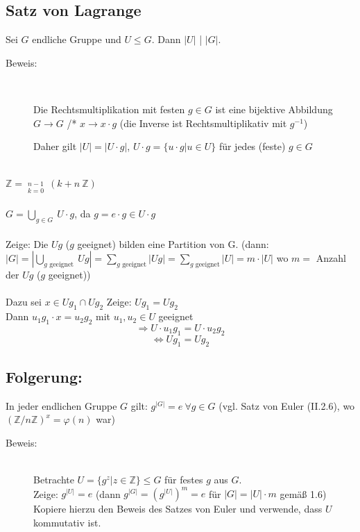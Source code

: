 \subsection{Satz von Lagrange}
Sei $G$ endliche Gruppe und $U \leq G$. Dann $|U|$ \Large{|} \normalsize{$|G|$}.
\begin{description}
	\item[Beweis:] \quad\\
	\item[] Die Rechtsmultiplikation mit festen $g \in G$ ist eine bijektive Abbildung $G \rightarrow G$ /* $x \rightarrow x 
		\cdot g$ (die Inverse ist Rechtsmultiplikativ mit $g^{-1}$)
	\item[] Daher gilt $|U| = |U \cdot g|$, $U \cdot g = \{u \cdot g|u \in U\}$ für jedes (feste) $g \in G$
\end{description}
\quad\\
$\mathbb{Z} = \mathop{\dot{\bigcup}}\limits^{n-1}_{k = 0} \ (k+n \ \mathbb{Z})$\\
\quad\\
$G = \mathop{\bigcup}\limits_{g \in G} \ U \cdot g$,  da $g = e \cdot g \in U \cdot g$\\
\quad\\
Zeige: Die $Ug$ ($g$ geeignet) bilden eine Partition von G. (dann:\\
 $|G| = | \mathop{\bigcup}\limits_{g \textrm{ geeignet}} \ Ug| = \sum\limits_{g\textrm{ geeignet}}|Ug| = \sum\limits_{g\textrm{ geeignet}} |U| = m \cdot |U|$ wo $m =$ Anzahl der $Ug$ ($g$ geeignet))\\
\quad\\
Dazu sei $x \in Ug_{1} \cap Ug_{2}$ Zeige: $Ug_{1} = Ug_{2}$\\
Dann $u_{1}g_{1} \cdot x = u_{2}g_{2}$ mit $u_{1}, u_{2} \in U$ geeignet
\begin{equation*}
	\Rightarrow U \cdot u_{1}g_{1} = U \cdot u_{2}g_{2}
\end{equation*}
\begin{equation*}
	\Leftrightarrow Ug_{1} = Ug_{2}
\end{equation*}
%
%
%
\subsection{Folgerung:}
In jeder endlichen Gruppe $G$ gilt: $g^{|G|} = e \ \forall g \in G$ (vgl. Satz von Euler (II.2.6), wo $(\mathbb{Z}/n\mathbb{Z})^{x} = \varphi(n)$ war)
\begin{description}
	\item[Beweis:] \quad\\
			Betrachte $U=\{g^{z}|z \in \mathbb{Z}\} \leq G$ für festes $g$ aus $G$. \\
			Zeige: $g^{|U|} = e$ (dann $g^{|G|}=(g^{|U|})^{m}=e$ für $|G| = |U| \cdot m$ gemäß 1.6)\\
			Kopiere hierzu den Beweis des Satzes von Euler und verwende, dass $U$ kommutativ ist.
\end{description}
%
%
%
